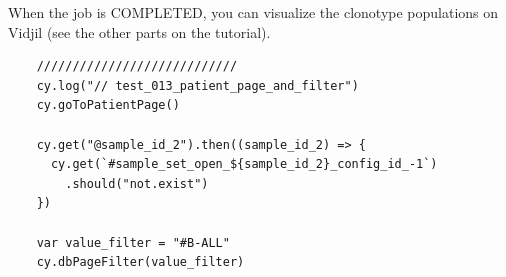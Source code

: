 When the job is COMPLETED, 
you can visualize the clonotype populations on Vidjil
(see the other parts on the tutorial).


\begin{verbatim}
    ////////////////////////////
    cy.log("// test_013_patient_page_and_filter")
    cy.goToPatientPage()

    cy.get("@sample_id_2").then((sample_id_2) => {
      cy.get(`#sample_set_open_${sample_id_2}_config_id_-1`)
        .should("not.exist")
    })

    var value_filter = "#B-ALL"
    cy.dbPageFilter(value_filter)

\end{verbatim}

